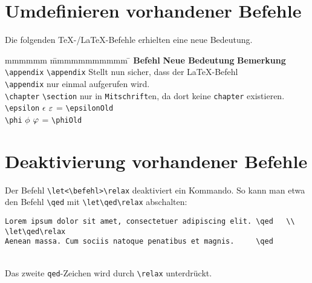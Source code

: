 		\section{Umdefinieren vorhandener Befehle}
			Die folgenden \TeX-/\LaTeX-Befehle erhielten eine neue Bedeutung.
			\begin{tabbing}
				mmmmmm				\= mmmmmmmmmmm				\= \kill
				\textbf{Befehl}		\> \textbf{Neue Bedeutung}	\> \textbf{Bemerkung}														\\
				\verb|\appendix|	\> \verb|\appendix|			\> Stellt nun sicher, dass der \LaTeX-Befehl 								\\
									\> 							\> \verb|\appendix| nur einmal aufgerufen wird.								\\
				\verb|\chapter|		\> \verb|\section|			\> nur in \texttt{Mitschrift}en, da dort keine \texttt{chapter} existieren.	\\
				\verb|\epsilon|		\> $\epsilon$				\> $\epsilonOld$ = \verb|\epsilonOld|										\\
				\verb|\phi|			\> $\phi$					\> $\phiOld$ = \verb|\phiOld|
			\end{tabbing}
		\section{Deaktivierung vorhandener Befehle}
			Der Befehl \verb|\let<\befehl>\relax| deaktiviert ein Kommando. So kann man etwa den Befehl \verb|\qed| mit \verb|\let\qed\relax| abschalten:
			\begin{verbatim}
Lorem ipsum dolor sit amet, consectetuer adipiscing elit. \qed   \\
\let\qed\relax
Aenean massa. Cum sociis natoque penatibus et magnis.     \qed
			\end{verbatim}

			\vspace*{1em}\\
			  Das zweite \texttt{qed}-Zeichen wird durch \verb|\relax| unterdrückt.

